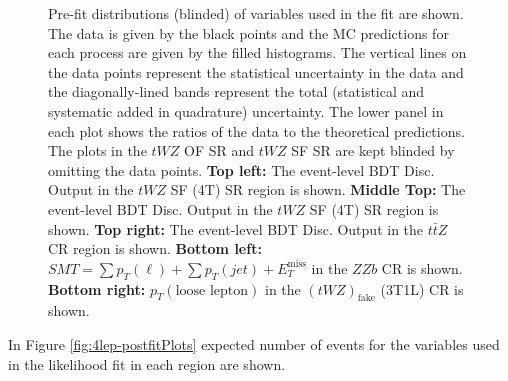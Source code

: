 \begin{figure}[htbp]
        \caption{Pre-fit distributions (blinded) of variables used in the fit are shown. The data is given by the black points and the MC predictions for each process are given by the filled histograms. The vertical lines on the data points represent the statistical uncertainty in the data and the diagonally-lined bands represent the total (statistical and systematic added in quadrature) uncertainty. The lower panel in each plot shows the ratios of the data to the theoretical predictions. The plots in the $tWZ$ OF SR and $tWZ$ SF SR are kept blinded by omitting the data points. \textbf{Top left:} The event-level BDT Disc. Output in the $tWZ$ SF (4T) SR region is shown. \textbf{Middle Top:} The event-level BDT Disc. Output in the $tWZ$ SF (4T) SR region is shown. \textbf{Top right:} The event-level BDT Disc. Output in the $t\bar{t}Z$ CR region is shown. \textbf{Bottom left:} $SMT = \sum p_{T} (\ell) + \sum p_{T} (jet) + E_{T}^{\text{miss}}$ in the $ZZb$ CR is shown. \textbf{Bottom right:} $p_{T}(\text{loose lepton})$ in the $(tWZ)_{\text{fake}}$ (3T1L) CR is shown.}
  \label{fig:4lep-prefitPlots}
\end{figure}


In Figure \ref{fig:4lep-postfitPlots} expected number of events for the variables used in the likelihood fit in each region are shown.

